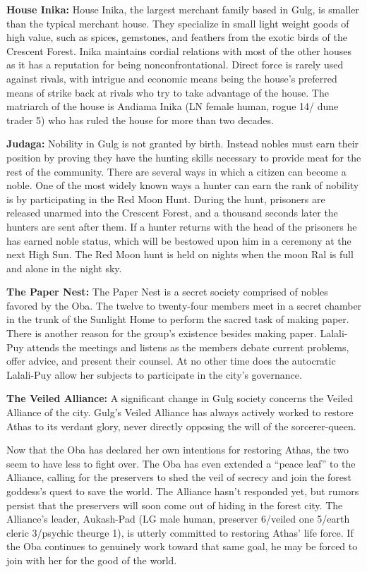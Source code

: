 {

	\textbf{House Inika:} House Inika, the largest merchant family based in Gulg, is smaller than the typical merchant house. They specialize in small light weight goods of high value, such as spices, gemstones, and feathers from the exotic birds of the Crescent Forest. Inika maintains cordial relations with most of the other houses as it has a reputation for being nonconfrontational. Direct force is rarely used against rivals, with intrigue and economic means being the house's preferred means of strike back at rivals who try to take advantage of the house. The matriarch of the house is Andiama Inika (LN female human, rogue 14/ dune trader 5) who has ruled the house for more than two decades.

	\textbf{Judaga:} Nobility in Gulg is not granted by birth. Instead nobles must earn their position by proving they have the hunting skills necessary to provide meat for the rest of the community. There are several ways in which a citizen can become a noble. One of the most widely known ways a hunter can earn the rank of nobility is by participating in the Red Moon Hunt. During the hunt, prisoners are released unarmed into the Crescent Forest, and a thousand seconds later the hunters are sent after them. If a hunter returns with the head of the prisoners he has earned noble status, which will be bestowed upon him in a ceremony at the next High Sun. The Red Moon hunt is held on nights when the moon Ral is full and alone in the night sky.

	\textbf{The Paper Nest:} The Paper Nest is a secret society comprised of nobles favored by the Oba. The twelve to twenty-four members meet in a secret chamber in the trunk of the Sunlight Home to perform the sacred task of making paper. There is another reason for the group's existence besides making paper. Lalali-Puy attends the meetings and listens as the members debate current problems, offer advice, and present their counsel. At no other time does the autocratic Lalali-Puy allow her subjects to participate in the city's governance.

	\textbf{The Veiled Alliance:} A significant change in Gulg society concerns the Veiled Alliance of the city. Gulg's Veiled Alliance has always actively worked to restore Athas to its verdant glory, never directly opposing the will of the sorcerer-queen.

	Now that the Oba has declared her own intentions for restoring Athas, the two seem to have less to fight over. The Oba has even extended a ``peace leaf'' to the Alliance, calling for the preservers to shed the veil of secrecy and join the forest goddess's quest to save the world. The Alliance hasn't responded yet, but rumors persist that the preservers will soon come out of hiding in the forest city. The Alliance's leader, Aukash-Pad (LG male human, preserver 6/veiled one 5/earth cleric 3/psychic theurge 1), is utterly committed to restoring Athas' life force. If the Oba continues to genuinely work toward that same goal, he may be forced to join with her for the good of the world.
}
